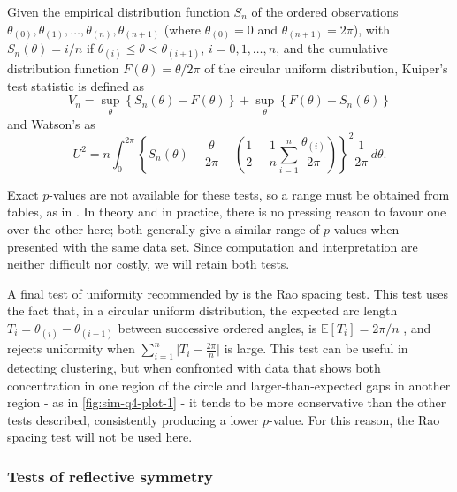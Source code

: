 \documentclass[../../ArchStats.tex]{subfiles}
\begin{document}
Given the empirical distribution function $S_n$ of the ordered observations $\theta_{(0)}, \theta_{(1)}, \dots, \theta_{(n)}, \theta_{(n+1)}$ (where $\theta_{(0)} = 0$ and $\theta_{(n+1)} = 2\pi$), with $S_n(\theta) = i/n$ if $\theta_{(i)} \leq \theta < \theta_{(i+1)}$, $i = 0,1,\dots, n$, and the cumulative distribution function $F(\theta) = \theta/2\pi$ of the circular uniform distribution, Kuiper's test statistic is defined as
\begin{equation}
V_n = \sup_\theta \left\lbrace S_n(\theta) - F(\theta) \right\rbrace + 
\sup_\theta \left\lbrace F(\theta) - S_n(\theta) \right\rbrace 
\end{equation}
and Watson's as
\begin{equation}
U^2 = n \int_0^{2\pi} \left\lbrace S_n(\theta) - \frac{\theta}{2\pi} - \left(\frac{1}{2} - \frac{1}{n} \sum_{i=1}^n \frac{\theta_{(i)}}{2\pi} \right) \right\rbrace^2 \frac{1}{2\pi}\, d\theta.
\end{equation}

Exact $p$-values are not available for these tests, so a range must be obtained from tables, as in \cite{Mardia1999}. In theory and in practice, there is no pressing reason to favour one over the other here; both generally give a similar range of $p$-values when presented with the same data set. Since computation and interpretation are neither difficult nor costly, we will retain both tests.

A final test of uniformity recommended by \cite{Pewsey2014} is the Rao spacing test. This test uses the fact that, in a circular uniform distribution, the expected arc length $T_i = \theta_{(i)} - \theta_{(i-1)}$ between successive ordered angles, is 
$\mathbb{E}\left[T_i\right] = 2\pi/n$ , and rejects uniformity when $\sum_{i=1}^n \vert T_i - \frac{2\pi}{n}\vert$ is large. This test can be useful in detecting clustering, but when confronted with data that shows both concentration in one region of the circle and larger-than-expected gaps in another region - as in \ref{fig:sim-q4-plot-1} - it tends to be more conservative than the other tests described, consistently producing a lower $p$-value. For this reason, the Rao spacing test will not be used here.


\subsubsection{Tests of reflective symmetry}
\label{sec:refl-symmetry}
\end{document}
